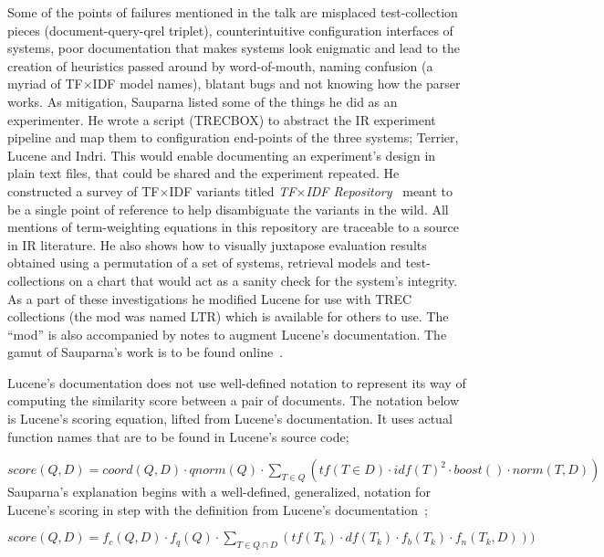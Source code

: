 Some of the points of failures mentioned in the talk are misplaced
test-collection pieces (document-query-qrel triplet), counterintuitive
configuration interfaces of systems, poor documentation that makes
systems look enigmatic and lead to the creation of heuristics passed
around by word-of-mouth, naming confusion (a myriad of TF$\times$IDF
model names), blatant bugs and not knowing how the parser works. As
mitigation, Sauparna listed some of the things he did as an
experimenter. He wrote a script (TRECBOX) to abstract the IR
experiment pipeline and map them to configuration end-points of the
three systems; Terrier, Lucene and Indri. This would enable
documenting an experiment's design in plain text files, that could be
shared and the experiment repeated. He constructed a survey of
TF$\times$IDF variants titled \emph{TF$\times$IDF
  Repository}~\cite{rup:TFXIDFRepository} meant to be a single point
of reference to help disambiguate the variants in the wild. All
mentions of term-weighting equations in this repository are traceable
to a source in IR literature. He also shows how to visually juxtapose
evaluation results obtained using a permutation of a set of systems,
retrieval models and test-collections on a chart that would act as a
sanity check for the system's integrity. As a part of these
investigations he modified Lucene for use with TREC collections (the
mod was named LTR) which is available for others to use. The ``mod''
is also accompanied by notes to augment Lucene's documentation. The
gamut of Sauparna's work is to be found online~\cite{rup:IR}.

Lucene's documentation does not use well-defined notation to represent
its way of computing the similarity score between a pair of
documents. The notation below is Lucene's scoring equation, lifted
from Lucene's documentation. It uses actual function names that are to
be found in Lucene's source code;

$score(Q,D) = coord(Q,D) \cdot qnorm(Q) \cdot \displaystyle\sum_{T \in Q} (tf(T \in D) \cdot idf(T)^2 \cdot boost() \cdot norm(T, D))$\\

Sauparna's explanation begins with a well-defined, generalized,
notation for Lucene's scoring in step with the definition from
Lucene's documentation~\cite{Lucene:6.2.1:Scoring};

$score(Q,D) = f_{c}(Q,D) \cdot f_{q}(Q) \cdot \displaystyle\sum_{T \in Q \cap D}(tf(T_{k}) \cdot df(T_{k}) \cdot f_{b}(T_{k}) \cdot f_{n}(T_{k},D)))$\\

